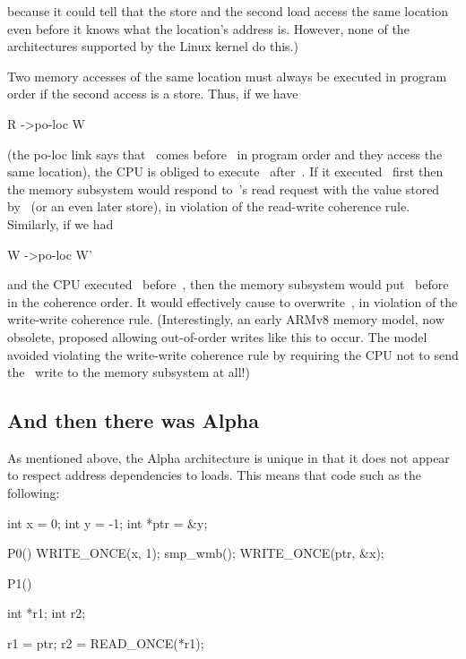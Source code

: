 \noindent%
because it could tell that the store and the second load access the
same location even before it knows what the location's address is.
However, none of the architectures supported by the Linux kernel do
this.)

Two memory accesses of the same location must always be executed in
program order if the second access is a store.
Thus, if we have

\begin{VerbatimU}
	R ->po-loc W
\end{VerbatimU}

\noindent%
(the po-loc link says that ~comes before~ in program order and they
access the same location), the CPU is obliged to execute~ after~.
If it executed~ first then the memory subsystem would respond to~'s
read request with the value stored by~ (or an even later store), in
violation of the read-write coherence rule.
Similarly, if we had

\begin{VerbatimU}
	W ->po-loc W'
\end{VerbatimU}

\noindent%
and the CPU executed~ before~, then the memory subsystem would
put~ before~ in the coherence order.
It would effectively cause  to overwrite~, in violation of
the write-write coherence rule.
(Interestingly, an early ARMv8 memory model, now obsolete, proposed
allowing out-of-order writes like this to occur.
The model avoided violating the write-write coherence rule by
requiring the CPU not to send the ~write to the memory subsystem at all!)


\subsection{And then there was Alpha}
\label{sec:docs:explanation:And then there Was Alpha}

As mentioned above, the Alpha architecture is unique in that it does
not appear to respect address dependencies to loads.
This means that code such as the following:

\begin{VerbatimU}
	int x = 0;
	int y = -1;
	int *ptr = &y;

	P0()
	{
		WRITE_ONCE(x, 1);
		smp_wmb();
		WRITE_ONCE(ptr, &x);
	}

	P1()
	{
		int *r1;
		int r2;

		r1 = ptr;
		r2 = READ_ONCE(*r1);
	}
\end{VerbatimU}

